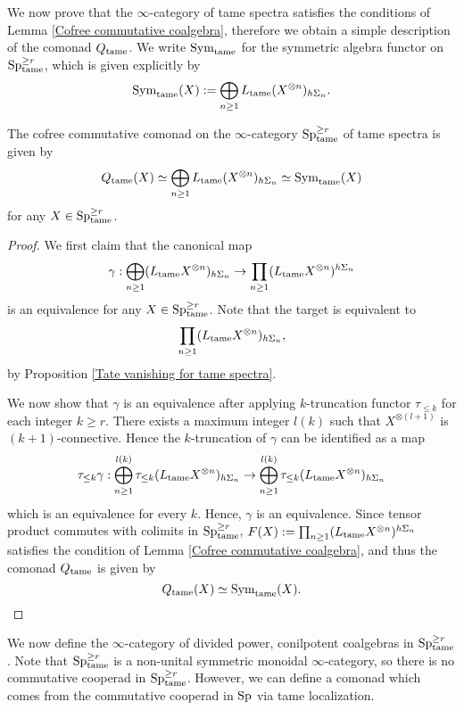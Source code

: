 We now prove that the $\infty$-category of tame spectra satisfies the conditions of Lemma
\ref{Cofree commutative coalgebra}, therefore we obtain a simple description of the comonad $Q_{\operatorname{\operatorname{tame}}}$.
We write $\operatorname{Sym}_{\operatorname{\operatorname{tame}}}$ for the symmetric algebra functor on $\operatorname{Sp}^{\geq r}_{\operatorname{\operatorname{tame}}}$, which is given explicitly by
$$
\operatorname{Sym}_{\operatorname{\operatorname{tame}}}(X) :=\bigoplus_{n\geq 1} L_{\operatorname{\operatorname{tame}}}(X^{\otimes n})_{h\Sigma_n} .
$$
\begin{proposition}
\label{Cofreee commutative comonad}
	The cofree commutative comonad on the $\infty$-category $\operatorname{Sp}^{\geq r}_{\operatorname{\operatorname{tame}}}$ of tame spectra is given by
	 $$
	 Q_{\operatorname{\operatorname{tame}}}(X) \simeq \bigoplus_{n\geq 1} L_{\operatorname{\operatorname{tame}}}(X^{\otimes n})_{h\Sigma_n}
	 \simeq
	 \operatorname{Sym}_{\operatorname{\operatorname{tame}}}(X)
	 $$
	 for any $X \in \operatorname{Sp}^{\geq r}_{\operatorname{\operatorname{tame}}}$.
\end{proposition}
\begin{proof}
    We first claim that the canonical map 
    $$
	\gamma: \bigoplus_{n\geq 1} (L_{\operatorname{\operatorname{tame}}}X^{\otimes n})_{h\Sigma_n}
	\to 
	\prod_{n\geq 1} (L_{\operatorname{\operatorname{tame}}}X^{\otimes n})^{h\Sigma_n}
	$$
	is an equivalence for any $X \in \operatorname{Sp}^{\geq r}_{\operatorname{\operatorname{tame}}}$.
    Note that the target is equivalent to 
    $$
    \prod_{n\geq 1} (L_{\operatorname{\operatorname{tame}}} X^{\otimes n})_{h\Sigma_n},
    $$
    by Proposition \ref{Tate vanishing for tame spectra}.
    
    We now show that $\gamma$ is an equivalence after applying $k$-truncation functor $\tau_{\leq k}$ for each integer $k\geq r$.
	There exists a maximum integer $l(k)$ such that $X^{\otimes (l+1)}$ is $(k+1)$-connective.
	Hence the $k$-truncation of $\gamma$ can be identified as a map
	$$
	\tau_{\leq k} \gamma: \bigoplus_{n\geq 1}^{l(k)}
	\tau_{\leq k} (L_{\operatorname{\operatorname{tame}}}X^{\otimes n})_{h\Sigma_n}
	\to 
	\bigoplus_{n\geq 1}^{l(k)}
	\tau_{\leq k} (L_{\operatorname{\operatorname{tame}}}X^{\otimes n})_{h\Sigma_n}
	$$
	 which is an equivalence for every $k$. Hence, $\gamma$ is an equivalence.
	 Since tensor product commutes with colimits in $\operatorname{Sp}^{\geq r}_{\operatorname{\operatorname{tame}}}$, $F(X):=\prod_{n\geq 1} (L_{\operatorname{\operatorname{tame}}} X^{\otimes n})^{h\Sigma_n}$ satisfies the condition of Lemma
    \ref{Cofree commutative coalgebra}, and thus the comonad $Q_{\operatorname{\operatorname{tame}}}$ is given by 
    $$
    Q_{\operatorname{\operatorname{tame}}}(X) \simeq  \operatorname{Sym}_{\operatorname{\operatorname{tame}}}(X).
    $$
	\end{proof}
We now define the $\infty$-category of divided power, conilpotent coalgebras in $\operatorname{Sp}_{\operatorname{\operatorname{tame}}}^{\geq r}$. Note that $\operatorname{Sp}_{\operatorname{\operatorname{tame}}}^{\geq r}$ is a non-unital symmetric monoidal $\infty$-category, so there is no commutative cooperad in $\operatorname{Sp}_{\operatorname{\operatorname{tame}}}^{\geq r}$. However, we can define a comonad which comes from the commutative cooperad in $\operatorname{Sp}$ via tame localization.

